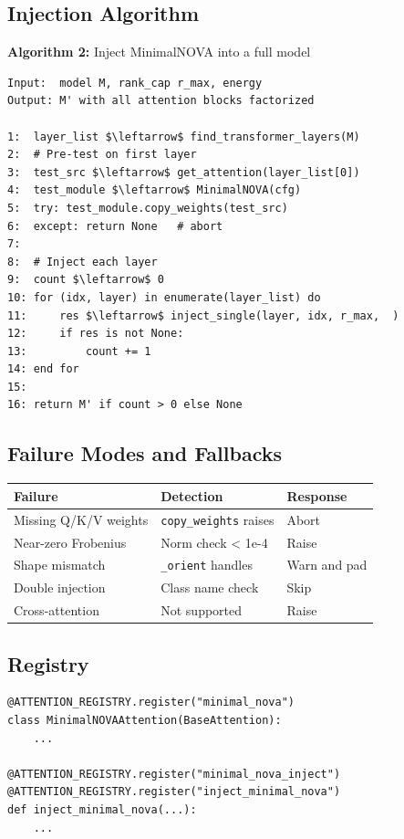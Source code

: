 \subsection{Injection Algorithm}

\textbf{Algorithm 2:} Inject MinimalNOVA into a full model
\begin{lstlisting}
Input:  model M, rank_cap r_max, energy  
Output: M' with all attention blocks factorized

1:  layer_list $\leftarrow$ find_transformer_layers(M)
2:  # Pre-test on first layer
3:  test_src $\leftarrow$ get_attention(layer_list[0])
4:  test_module $\leftarrow$ MinimalNOVA(cfg)
5:  try: test_module.copy_weights(test_src)
6:  except: return None   # abort
7:
8:  # Inject each layer
9:  count $\leftarrow$ 0
10: for (idx, layer) in enumerate(layer_list) do
11:     res $\leftarrow$ inject_single(layer, idx, r_max,  )
12:     if res is not None:
13:         count += 1
14: end for
15:
16: return M' if count > 0 else None
\end{lstlisting}

\subsection{Failure Modes and Fallbacks}

\begin{table}[H]
\centering
\small
\begin{tabular}{lll}
\toprule
\textbf{Failure} & \textbf{Detection} & \textbf{Response} \\
\midrule
Missing Q/K/V weights & \texttt{copy\_weights} raises & Abort \\
Near-zero Frobenius & Norm check < 1e-4 & Raise \\
Shape mismatch & \texttt{\_orient} handles & Warn and pad \\
Double injection & Class name check & Skip \\
Cross-attention & Not supported & Raise \\
\bottomrule
\end{tabular}
\end{table}

\subsection{Registry}

\begin{lstlisting}
@ATTENTION_REGISTRY.register("minimal_nova")
class MinimalNOVAAttention(BaseAttention):
    ...

@ATTENTION_REGISTRY.register("minimal_nova_inject")
@ATTENTION_REGISTRY.register("inject_minimal_nova")
def inject_minimal_nova(...):
    ...
\end{lstlisting}

